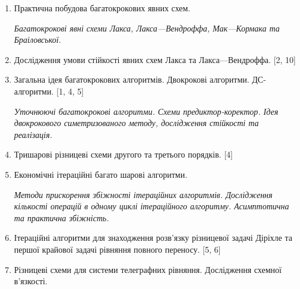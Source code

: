 \begin{enumerate}
    \item Практична побудова багатокрокових явних схем. \medskip 
    
    \textit{Багатокрокові явні схеми Лакса, Лакса---Вендроффа, Мак---Кормака та Браіловської.}

    \item Дослідження умови стійкості явних схем Лакса та Лакса---Вендроффа. [2, 10]

    \item Загальна ідея багатокрокових алгоритмів. Двокрокові алгоритми. ДС-алгоритми. [1, 4, 5] \medskip 
    
    \textit{Уточнюючі багатокрокові алгоритми. Схеми предиктор-коректор. Ідея двокрокового симетризованого методу, дослідження стійкості та реалізація.}

    \item Тришарові різницеві схеми другого та третього порядків. [4]

    \item Економічні ітераційні багато шарові алгоритми. \medskip 
    
    \textit{Методи прискорення збіжності ітераційних алгоритмів. Дослідження кількості операцій в одному циклі ітераційного алгоритму. Асимптотична та практична збіжність.}

    \item Ітераційні алгоритми для знаходження розв'язку різницевої задачі Діріхле та першої крайової задачі рівняння повного переносу. [5, 6]
    
    \item Різницеві схеми для системи телеграфних рівняння. Дослідження схемної в'яз\-кос\-ті.
\end{enumerate}
